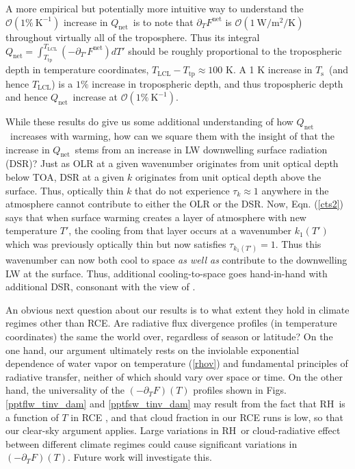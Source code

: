 \documentclass[10pt]{article}
\newcommand{\eqnref}[1]{(\ref{#1})}
\newcommand{\ppt}{\ensuremath{\partial_T}}
\newcommand{\Qnet}{\ensuremath{Q_\mathrm{net}}}
\newcommand{\Fnet}{\ensuremath{F^\mathrm{net}}}
\newcommand{\tauk}{\ensuremath{\tau_k}}
\newcommand{\Wmsq}{\ensuremath{\mathrm{W/m^2}}}
\newcommand{\Ts}{\ensuremath{T_\mathrm{s}}}
\newcommand{\RH}{\ensuremath{\mathrm{RH}}}
\newcommand{\Tlcl}{\ensuremath{T_\mathrm{LCL}}}
\newcommand{\Ttp}{\ensuremath{T_\mathrm{tp}}}
\newcommand{\Kinverse}{\ensuremath{\mathrm{K^{-1}}}}
\begin{document}
A more empirical but potentially more intuitive way to understand the $\mathcal{O}(1 \%\ \Kinverse)$ increase in \Qnet\ is to note that $\ppt \Fnet$ is $\mathcal{O}(1\ \Wmsq/\mathrm{K})$ throughout virtually all of the troposphere. Thus its integral $\Qnet =  \int_{\Ttp}^{\Tlcl} (-\partial_{T'} \Fnet) dT'$  should be roughly proportional to the tropospheric depth in temperature coordinates, $\Tlcl - \Ttp \approx 100$ K.  A 1 K increase in \Ts\ (and hence \Tlcl) is a $1\%$ increase in tropospheric depth, and thus tropospheric depth and hence \Qnet\  increase at  $\mathcal{O}(1 \%\ \Kinverse)$.

While these results do give us some additional understanding of how \Qnet\ increases with warming, how can we square them with the insight of \cite{pendergrass2014} that the increase in \Qnet\ stems from an increase in LW downwelling surface radiation (DSR)? Just as OLR at a given wavenumber originates from unit optical depth below TOA, DSR at a given $k$ originates from unit optical depth above the surface. Thus, optically thin $k$ that do not experience $\tauk \approx 1$ anywhere in the atmosphere cannot contribute to either the OLR or the DSR. 
 Now, Eqn. \eqnref{cts2} says that when surface warming creates a layer of atmosphere with new temperature $T'$,  the cooling from that layer occurs at a wavenumber $k_1(T')$ which was previously optically thin but now satisfies $\tau_{k_1(T')} = 1$. Thus this wavenumber can now both cool to space \emph{as well as} contribute to the downwelling LW at the surface. Thus, additional cooling-to-space goes hand-in-hand with additional DSR, consonant with the view of \cite{pendergrass2014}.

An obvious next question about our results is to what extent they hold in climate regimes other than RCE.  Are radiative  flux divergence profiles (in temperature coordinates) the same the world over, regardless of season or latitude? On the one hand,  our argument ultimately rests on the inviolable exponential dependence of water vapor on temperature \eqnref{rhov} and fundamental principles of radiative transfer, neither of which should vary over space or time. On the other hand,  the universality of the $(-\ppt F)(T)$ profiles shown in Figs. \ref{pptflw_tinv_dam} and \ref{pptfsw_tinv_dam}  may result from the fact that \RH\ is a function of $T$ in RCE \citep{romps2014}, and that cloud fraction in our RCE runs is low, so that our clear-sky argument applies. Large variations in \RH\ or cloud-radiative effect between different climate regimes could cause significant variations in  $(-\ppt F)(T)$. Future work will investigate this.
\end{document}
